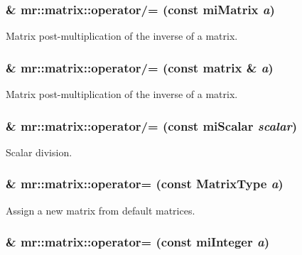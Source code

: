 \subsubsection{\& mr::matrix::operator/= (const mi\-Matrix {\em a})\hspace{0.3cm}{\tt  [inline]}}\label{classmr_1_1matrix_z23_34}


Matrix post-multiplication of the inverse of a matrix. 

\subsubsection{\& mr::matrix::operator/= (const {\bf matrix} \& {\em a})\hspace{0.3cm}{\tt  [inline]}}\label{classmr_1_1matrix_z23_33}


Matrix post-multiplication of the inverse of a matrix. 

\subsubsection{\& mr::matrix::operator/= (const mi\-Scalar {\em scalar})\hspace{0.3cm}{\tt  [inline]}}\label{classmr_1_1matrix_z23_32}


Scalar division. 

\subsubsection{\& mr::matrix::operator= (const {\bf Matrix\-Type} {\em a})\hspace{0.3cm}{\tt  [inline]}}\label{classmr_1_1matrix_z21_3}


Assign a new matrix from default matrices. 

\subsubsection{\& mr::matrix::operator= (const mi\-Integer {\em a})\hspace{0.3cm}{\tt  [inline]}}\label{classmr_1_1matrix_z21_2}


